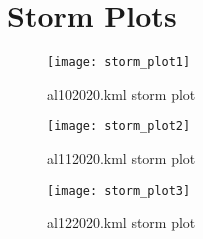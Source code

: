 \documentclass[]{article}
\begin{document}
\section{Storm Plots}

\begin{figure}[!h]
  \centering
  \texttt{[image: storm\_plot1]}  
  \caption{al102020.kml storm plot}
  \label{fig:al10}
\end{figure}

\begin{figure}[!h]
  \centering
  \texttt{[image: storm\_plot2]}  
  \caption{al112020.kml storm plot}
  \label{fig:al11}
\end{figure}

\begin{figure}[!h]
  \centering
  \texttt{[image: storm\_plot3]}  
  \caption{al122020.kml storm plot}
  \label{fig:al12}
\end{figure}
\end{document}
